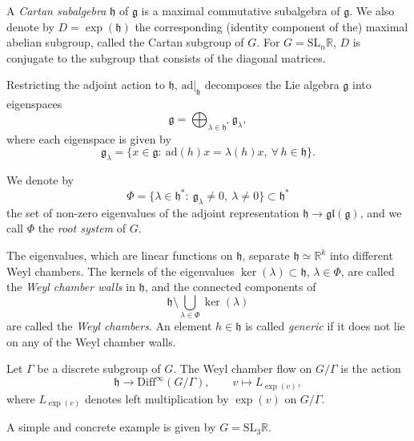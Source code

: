 \documentclass[11pt]{amsart}
\numberwithin{equation}{section}
\newcommand{\R}{\mathbb{R}}
\theoremstyle{plain}
\begin{document}
A \emph{Cartan subalgebra} $\mathfrak{h}$ of $\mathfrak{g}$ is a maximal commutative subalgebra of $\mathfrak{g}$. We also denote by $D=\exp(\mathfrak{h})$ the corresponding (identity component of the) maximal abelian subgroup, called the Cartan subgroup of $G$. For $G=\mathrm{SL}_n\R$, $D$ is conjugate to the subgroup that consists of the diagonal matrices.

Restricting the adjoint action to $\mathfrak{h}$, $\mathrm{ad}|_{\mathfrak{h}}$ decomposes the Lie algebra $\mathfrak{g}$ into eigenspaces
\[
\mathfrak{g}=\bigoplus_{\lambda\in \mathfrak{h}^*}\mathfrak{g}_\lambda,
\]
where each eigenspace is given by
\[
\mathfrak{g}_\lambda=\{x\in \mathfrak{g}:\ \mathrm{ad}(h)x={\lambda(h)}x,\ \forall\, h\in \mathfrak{h}\}.
\]

We denote by
\[
\Phi=\{\lambda\in \mathfrak{h}^*:\ \mathfrak{g}_\lambda\neq 0,\ \lambda\neq 0\}\subset \mathfrak{h}^*
\]
the set of non-zero eigenvalues of the adjoint representation $\mathfrak{h}\to \mathfrak{gl}(\mathfrak{g})$, and we call $\Phi$ the \emph{root system} of $G$.

The eigenvalues, which are linear functions on $\mathfrak{h}$, separate $\mathfrak{h}\simeq \R^k$ into different Weyl chambers. The kernels of the eigenvalues $\ker(\lambda)\subset \mathfrak{h}$, $\lambda\in \Phi$, are called the \emph{Weyl chamber walls} in $\mathfrak{h}$, and the connected components of
\[
\mathfrak{h}\setminus \bigcup_{\lambda\in \Phi}\ker(\lambda)
\]
are called the \emph{Weyl chambers}. An element $h\in \mathfrak{h}$ is called \emph{generic} if it does not lie on any of the Weyl chamber walls.

Let $\Gamma$ be a discrete subgroup of $G$. The Weyl chamber flow on $G/\Gamma$ is the action
\[
\mathfrak{h}\to \mathrm{Diff}^\infty(G/\Gamma),\qquad v\mapsto L_{\exp(v)},
\]
where $L_{\exp(v)}$ denotes left multiplication by $\exp(v)$ on $G/\Gamma$.

A simple and concrete example is given by $G=\mathrm{SL}_3\R$.
\end{document}
